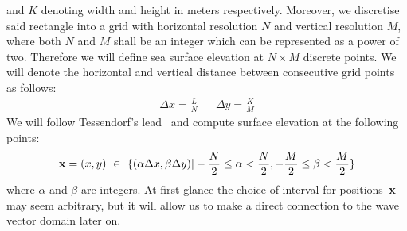 and $K$ denoting width and height in meters respectively. Moreover, we
discretise said rectangle into a grid with horizontal resolution $N$ and
vertical resolution $M$, where both $N$ and $M$ shall be an integer which can
be represented as a power of two. Therefore we will define sea surface elevation 
at $N\times M$ discrete points. We will denote the horizontal and vertical
distance between consecutive grid points as follows:
\begin{align}
 \Delta x = \frac{L}{N} && \Delta y = \frac{K}{M}
\end{align}
We will follow Tessendorf's lead~\cite{course:simulatingocean} and compute
surface elevation at the following points:
\begin{equation}
\label{eq:spatial_domain}
 \mathbf{x} = (x,y)~\in~\{(\alpha\Delta x,\beta\Delta y)|
-\frac{N}{2}\leq\alpha<\frac{N}{2},-\frac{M}{2}\leq\beta<\frac{M}{2}\}
\end{equation}
where $\alpha$ and $\beta$ are integers. At first glance the choice of interval
for positions~$\mathbf{x}$ may seem arbitrary, but it will allow us to make a
direct connection to the wave vector domain later on.\\

